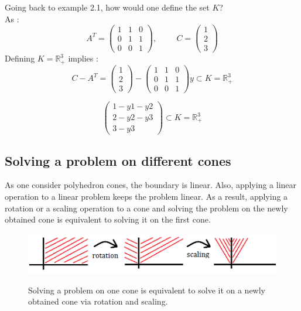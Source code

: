 \documentclass[10pt,a4paper]{article}
\begin{document}
\begin{example}
Going back to  example 2.1, how would one define the set $K$?\\
As : 
\[A^T = \left( \begin{array}{ccc}
1 & 1 & 0 \\
0 & 1 & 1 \\
0 & 0 & 1 \end{array} \right), \hspace{1cm}
C = \left( \begin{array}{c}
1 \\
2 \\
3 \end{array} \right) \]
Defining $K = \mathbb{R}^3_+$ implies : 
\[C-A^T = 
\left( \begin{array}{c}
1 \\
2 \\
3 \end{array} \right)-
\left( \begin{array}{ccc}
1 & 1 & 0 \\
0 & 1 & 1 \\
0 & 0 & 1 
\end{array} \right) y
\subset K = \mathbb{R}^3_+ 
\]

\[\left( \begin{array}{c}
1 - y1 - y2 \\
2 - y2 - y3\\
3 - y3 \end{array} \right) 
\subset K = \mathbb{R}^3_+ 
\]
\end{example}
\subsection{Solving a problem on different cones}
As one consider polyhedron cones, the boundary is linear. Also, applying a linear operation to a linear problem keeps the problem linear.  
As a result, applying a rotation or a scaling operation to a cone and solving the problem on the newly obtained cone is equivalent to solving it on the first cone.
\begin{center}
\begin{figure}[h]
\centering
   \includegraphics[scale=0.6]{ConicFormulationCM7equivalenceCones.png}\\
    \label{bruno}
   \caption{Solving a problem on one cone is equivalent to solve it on a newly obtained cone via rotation and scaling.}
\end{figure}
\end{center}
\end{document}
